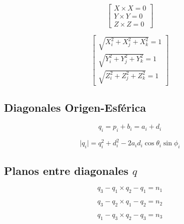 \documentclass[titlepage, letterpaper, fleqn]{article}
\begin{document}
\begin{equation}
    \label{eq:cross_same_unit_vector}
    \begin{bmatrix}
    X \times X = 0 \\
    Y \times Y = 0 \\
    Z \times Z = 0
    \end{bmatrix}
\end{equation}

\begin{equation}
    \label{eq:magnitude_unit_vector}
    \begin{bmatrix}
    \sqrt{X_i^2 + X_j^2 + X_k^2} = 1 \\
    \sqrt{Y_i^2 + Y_j^2 + Y_k^2} = 1 \\
    \sqrt{Z_i^2 + Z_j^2 + Z_k^2} = 1
    \end{bmatrix}
\end{equation}


\subsection{Diagonales Origen-Esférica} %
\label{subsec:diagonales_origen_esferica}

\begin{equation}
    \label{eq:q_vectors}
    q_i = p_i + b_i = a_i + d_i
\end{equation}

\begin{equation}
    \label{eq:q_vector_magnitude}
    \lvert q_i \rvert = q_i^2 + d_i^2 - 2a_id_i\cos\theta_i\sin\phi_i
\end{equation}


\subsection{Planos entre diagonales $q$} %
\label{sec:planos_diagonales}

\begin{equation}
    \label{eq:plane_n1}
    q_3 - q_1 \times q_2 - q_1 = n_1 
\end{equation}

\begin{equation}
    \label{eq:plane_n2}
    q_3 - q_2 \times q_1 - q_2 = n_2 
\end{equation}

\begin{equation}
    \label{eq:plane_n3}
    q_1 - q_3 \times q_2 - q_3 = n_3 
\end{equation}





\end{document}
